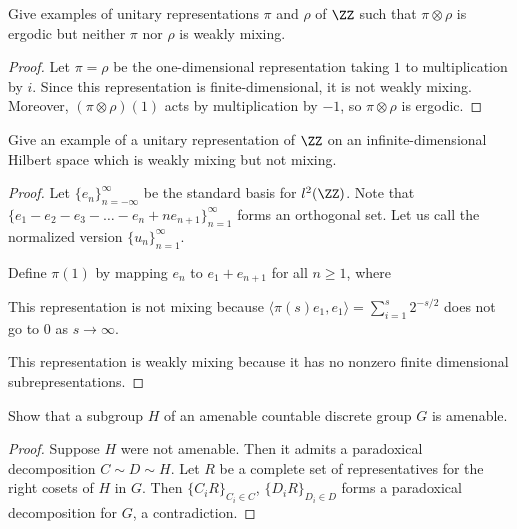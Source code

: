 \documentclass{article}
\begin{document}
 Give examples of unitary representations $\pi$ and $\rho$ of $\ZZ$ such that $\pi \otimes \rho$ is ergodic but neither $\pi$ nor $\rho$ is weakly mixing.
\begin{proof}
Let $\pi = \rho$ be the one-dimensional representation taking $1$ to multiplication by $i$.  Since this representation is finite-dimensional, it is not weakly mixing. Moreover, $(\pi \otimes \rho)(1)$ acts by multiplication by $-1$, so $\pi \otimes \rho$ is ergodic.
\end{proof}

 Give an example of a unitary representation of $\ZZ$ on an infinite-dimensional Hilbert space which is weakly mixing but not mixing.
\begin{proof}
Let $\{e_n\}_{n = -\infty}^\infty$ be the standard basis for $l^2(\ZZ)$.
Note that $\{e_1 - e_2 - e_3 - \ldots -e_{n} + n e_{n+1}\}_{n=1}^\infty$ forms an orthogonal set. Let us call the normalized version $\{u_n\}_{n=1}^\infty$.

Define $\pi(1)$ by mapping $e_n$ to $e_1 + e_{n+1}$ for all $n \ge 1$, where 

This representation is not mixing because $\langle \pi(s) e_1, e_1 \rangle = \sum_{i=1}^s 2^{-s/2}$ does not go to $0$ as $s \to \infty$.

This representation is weakly mixing because it has no nonzero finite dimensional subrepresentations.
\end{proof}

 Show that a subgroup $H$ of an amenable countable discrete group $G$ is amenable.
\begin{proof}
Suppose $H$ were not amenable.  Then it admits a paradoxical decomposition $C \sim D \sim H$. Let $R$ be a complete set of representatives for the right cosets of $H$ in $G$. Then $\{C_iR\}_{C_i \in C}$, $\{D_iR\}_{D_i \in D}$ forms a paradoxical decomposition for $G$, a contradiction.
\end{proof}
\end{document}
